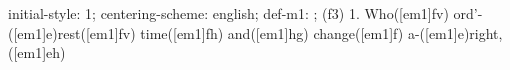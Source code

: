 initial-style: 1;
centering-scheme: english;
def-m1: \grealign;
(f3) 1. Who([em1]fv) ord'-([em1]e)rest([em1]fv) time([em1]fh) and([em1]hg) change([em1]f) a-([em1]e)right,([em1]eh)